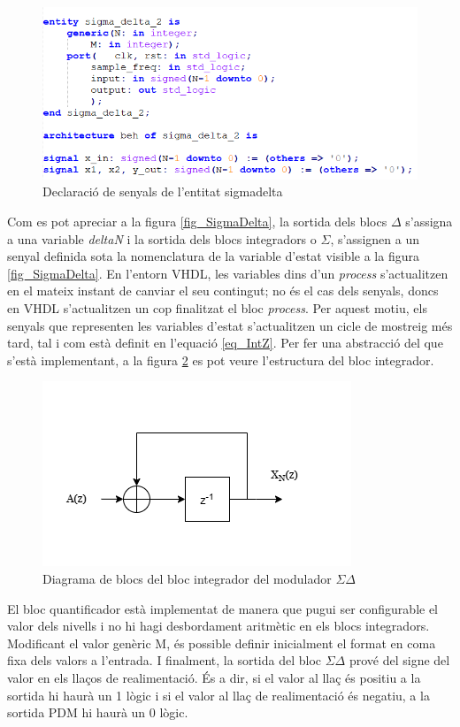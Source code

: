\begin{figure}[H]
    \centering
    \includegraphics[width=0.5\linewidth]{Images/signals_SDM.png}
    \caption{Declaració de senyals de l'entitat sigma\textunderscore delta}
    \label{fig_signalsSDM}
\end{figure}
\par Com es pot apreciar a la figura \ref{fig_SigmaDelta}, la sortida dels blocs $\Delta$ s'assigna a una variable \textit{deltaN} i la sortida dels blocs integradors o $\Sigma$, s'assignen a un senyal definida sota la nomenclatura de la variable d'estat visible a la figura \ref{fig_SigmaDelta}. En l'entorn VHDL, les variables dins d'un \textit{process} s'actualitzen en el mateix instant de canviar el seu contingut; no és el cas dels senyals, doncs en VHDL s'actualitzen un cop finalitzat el bloc \textit{process}. Per aquest motiu, els senyals que representen les variables d'estat s'actualitzen un cicle de mostreig més tard, tal i com està definit en l'equació \ref{eq_IntZ}. Per fer una abstracció del que s'està implementant, a la figura \ref{fig_integradordelay} es pot veure l'estructura del bloc integrador.
\begin{figure}[H]
    \centering
    \includegraphics[width=0.5\linewidth]{Images/DelayIntegrator.png}
    \caption{Diagrama de blocs del bloc integrador del modulador $\Sigma \Delta$}
    \label{fig_integradordelay}
\end{figure}
\par El bloc quantificador està implementat de manera que pugui ser configurable el valor dels nivells i no hi hagi desbordament aritmètic en els blocs integradors. Modificant el valor genèric M, és possible definir inicialment el format en coma fixa dels valors a l'entrada. I finalment, la sortida del bloc $\Sigma \Delta$ prové del signe del valor en els llaços de realimentació. És a dir, si el valor al llaç és positiu a la sortida hi haurà un 1 lògic i si el valor al llaç de realimentació és negatiu, a la sortida PDM hi haurà un 0 lògic.

